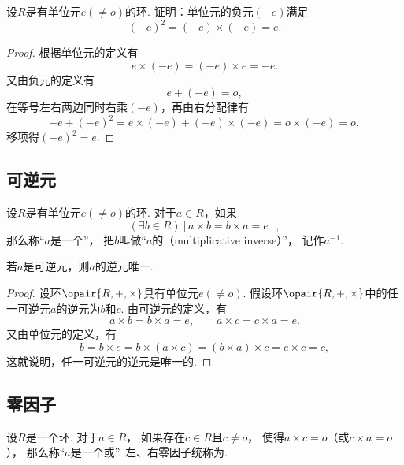 \begin{example}
设\(R\)是有单位元\(e(\neq o)\)的环.
证明：单位元的负元\((-e)\)满足\begin{equation*}
	(-e)^2=(-e)\times(-e)=e.
\end{equation*}
\begin{proof}
根据单位元的定义有\begin{equation*}
	e \times (-e) = (-e) \times e = -e.
\end{equation*}
又由负元的定义有\begin{equation*}
	e + (-e) = o,
\end{equation*}
在等号左右两边同时右乘\((-e)\)，再由右分配律有\begin{equation*}
	-e + (-e)^2 = e \times (-e) + (-e) \times (-e) = o \times (-e) = o,
\end{equation*}
移项得\((-e)^2 = e\).
\end{proof}
\end{example}

\subsection{可逆元}
\begin{definition}
设\(R\)是有单位元\(e(\neq o)\)的环.
对于\(a \in R\)，如果\begin{equation*}
	(\exists b \in R)[a \times b = b \times a = e],
\end{equation*}
那么称“\(a\)是一个”，
把\(b\)叫做“\(a\)的（multiplicative inverse）”，
记作\(a^{-1}\).
\end{definition}

\begin{proposition}
若\(a\)是可逆元，则\(a\)的逆元唯一.
\begin{proof}
设环\(\opair{R,+,\times}\)具有单位元\(e(\neq o)\).
假设环\(\opair{R,+,\times}\)中的任一可逆元\(a\)的逆元为\(b\)和\(c\).
由可逆元的定义，有\begin{equation*}
	a \times b = b \times a = e,
	\qquad
	a \times c = c \times a = e.
\end{equation*}
又由单位元的定义，有\begin{equation*}
	b = b \times e
	= b \times (a \times c)
	= (b \times a) \times c
	= e \times c
	= c,
\end{equation*}
这就说明，任一可逆元的逆元是唯一的.
\end{proof}
\end{proposition}

\subsection{零因子}
\begin{definition}
设\(R\)是一个环.
对于\(a \in R\)，
如果存在\(c \in R\)且\(c \neq o\)，
使得\(a \times c = o\)（或\(c \times a = o\)），
那么称“\(a\)是一个或”.
左、右零因子统称为.
\end{definition}

